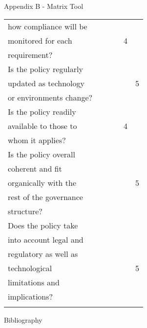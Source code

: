 \documentclass[unknownkeysallowed]{beamer}
\begin{document}
\begin{frame}[allowframebreaks,label=]{Appendix B - Matrix Tool}
\begin{longtable}{llllrr}
how compliance will be &  &  &  &  & \\
monitored for each &  &  &  & 4 & \\
requirement? &  &  &  &  & \\
\hline
Is the policy regularly &  &  &  &  & \\
updated as technology &  &  &  &  & 5\\
or environments change? &  &  &  &  & \\
\hline
Is the policy readily &  &  &  &  & \\
available to those to &  &  &  & 4 & \\
whom it applies? &  &  &  &  & \\
\hline
Is the policy overall &  &  &  &  & \\
coherent and fit &  &  &  &  & \\
organically with the &  &  &  &  & 5\\
rest of the governance &  &  &  &  & \\
structure? &  &  &  &  & \\
\hline
Does the policy take &  &  &  &  & \\
into account legal and &  &  &  &  & \\
regulatory as well as &  &  &  &  & \\
technological &  &  &  &  & 5\\
limitations and &  &  &  &  & \\
implications? &  &  &  &  & \\
\hline
 &  &  &  &  & \\
\end{longtable}
\end{frame}


\begin{frame}[allowframebreaks,label=]{Bibliography}
\printbibliography
\end{frame}
\end{document}

